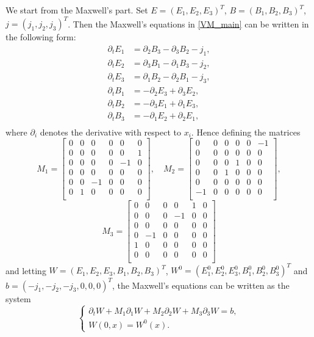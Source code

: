 \documentclass[reqno,a4paper]{amsart}
\theoremstyle{remark}
\numberwithin{equation}{section}
\def\d{\partial}
\begin{document}
We start from the Maxwell's part.
Set $E=(E_1,E_2,E_3)^T\!$, $B=(B_1,B_2,B_3)^T\!$, $j=(j_1,j_2,j_3)^T\!$.
Then the Maxwell's equations in \eqref{VM_main} can be written in the 
following form:
$$
\begin{aligned}
\d_t E_1 &= \d_2 B_3-\d_3 B_2 -j_1, \\
\d_t E_2 &= \d_3 B_1-\d_1 B_3 -j_2, \\
\d_t E_3 &= \d_1 B_2-\d_2 B_1 -j_3, \\
\d_t B_1 &= -\d_2 E_3+\d_3 E_2, \\
\d_t B_2 &= -\d_3 E_1+\d_1 E_3, \\
\d_t B_3 &= -\d_1 E_2+\d_2 E_1, \\
\end{aligned}
$$
where $\d_i$ denotes the derivative with respect to $x_i$.
Hence defining the matrices 
$$
M_1= \left[ \begin{array}{cccccc}
0 & 0 & 0 & 0 & 0 & 0 \\
0 & 0 & 0 & 0 & 0 & 1 \\
0 & 0 & 0 & 0 & -1& 0 \\
0 & 0 & 0 & 0 & 0 & 0 \\
0 & 0 & -1& 0 & 0 & 0 \\
0 & 1 & 0 & 0 & 0 & 0 \\
\end{array} \right] , \quad
M_2= \left[ \begin{array}{cccccc}
0 & 0 & 0 & 0 & 0 & -1\\
0 & 0 & 0 & 0 & 0 & 0 \\
0 & 0 & 0 & 1 & 0 & 0 \\
0 & 0 & 1 & 0 & 0 & 0 \\
0 & 0 & 0 & 0 & 0 & 0 \\
-1& 0 & 0 & 0 & 0 & 0 \\
\end{array} \right] ,
$$
$$
M_3= \left[ \begin{array}{cccccc}
0 & 0 & 0 & 0 & 1 & 0 \\
0 & 0 & 0 & -1& 0 & 0 \\
0 & 0 & 0 & 0 & 0 & 0 \\
0 & -1& 0 & 0 & 0 & 0 \\
1 & 0 & 0 & 0 & 0 & 0 \\
0 & 0 & 0 & 0 & 0 & 0 \\
\end{array} \right]
$$
and letting $W=(E_1,E_2,E_3,B_1,B_2,B_3)^T\!$,
$W^0=(E_1^0,E_2^0,E_3^0,B_1^0,B_2^0,B_3^0)^T\!$ 
and $b=(-j_1,-j_2,-j_3,0,0,0)^T\!$,
the Maxwell's equations can be written as the system 
\begin{equation} \label{maxwell}
\left\{ \begin{array}{ll}
\d_t W + M_1 \d_1 W + M_2 \d_2 W + M_3 \d_3 W=b, \\
W(0,x)=W^0(x).
\end{array} \right.
\end{equation}
\end{document}
